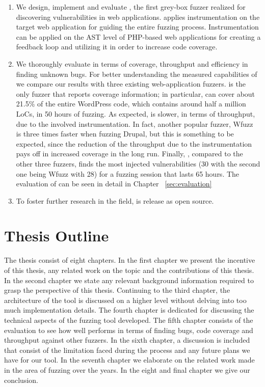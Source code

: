 \begin{enumerate}

\item We design, implement and evaluate \pname{}, the first grey-box fuzzer realized for discovering vulnerabilities in web applications. \pname{} applies instrumentation on the target web application for guiding the entire fuzzing process. Instrumentation can be applied on the AST level of PHP-based web applications for creating a feedback loop and utilizing it in order to increase code coverage.
\item We thoroughly evaluate \pname{} in terms of coverage, throughput and efficiency in finding unknown bugs. For better understanding the measured capabilities of \pname{} we compare our results with three existing web-application fuzzers. \pname{} is the only fuzzer that
reports coverage information; in particular, \pname{} can cover about 21.5\% of the entire WordPress code, which contains around half a million LoCs, in 50 hours of fuzzing. As expected, \pname{} is slower, in terms of throughput, due to the involved instrumentation. In fact, another popular fuzzer, Wfuzz ~\cite{wfuzz} is three times faster when fuzzing Drupal, but this is something to be expected, since the reduction of the throughput due to the instrumentation pays off in increased coverage in the long run. Finally, \pname{}, compared to the other three fuzzers, finds the most injected vulnerabilities (30 with the second one being Wfuzz with 28) for a fuzzing session that lasts 65 hours. The evaluation of \pname{} can be seen in detail in Chapter ~\ref{sec:evaluation}
\item To foster further research in the field, \pname{} is release as open source.

\end{enumerate}

\section{Thesis Outline}
The thesis consist of eight chapters. In the first chapter we present the incentive of this thesis, any related work on the topic and the contributions of this thesis. In the second chapter we state any relevant background information required to grasp the perspective of this thesis. Continuing to the third chapter, the architecture of the tool is discussed on a higher level without delving into too much implementation details. The fourth chapter is dedicated for discussing the technical aspects of the fuzzing tool developed. The fifth chapter consists of the evaluation to see how well \pname{} performs in terms of finding bugs, code coverage and throughput against other fuzzers. In the sixth chapter, a discussion is included that consist of the limitation faced during the process and any future plans we have for our tool. In the seventh chapter we elaborate on the related work made in the area of fuzzing over the years. In the eight and final chapter we give our conclusion.
